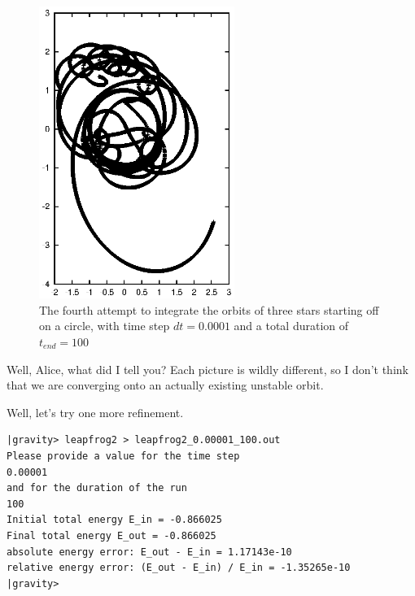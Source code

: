 \begin{figure}[htb]
\centering
\includegraphics[width=2.5in]{chap5/leapfrog2_0.0001_100.ps}
\caption[Three stars on a circle, leapfrog, $dt = 0.0001$, $t_{end} = 100$]
{The fourth attempt to integrate the orbits of three stars
starting off on a circle, with time step $dt = 0.0001$ and a total
duration of $t_{end} = 100$}
\label{fig:leap2-0.0001-100}
\end{figure}

\abc

\bob
Well, Alice, what did I tell you?  Each picture is wildly different,
so I don't think that we are converging onto an actually existing
unstable orbit.

\alice
Well, let's try one more refinement.

\cba

\begin{small}
\begin{verbatim}
|gravity> leapfrog2 > leapfrog2_0.00001_100.out
Please provide a value for the time step
0.00001
and for the duration of the run
100
Initial total energy E_in = -0.866025
Final total energy E_out = -0.866025
absolute energy error: E_out - E_in = 1.17143e-10
relative energy error: (E_out - E_in) / E_in = -1.35265e-10
|gravity>
\end{verbatim}
\end{small}

